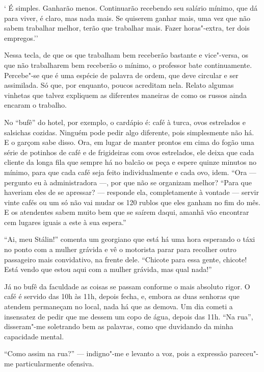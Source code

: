 ` É simples. Ganharão menos. Continuarão recebendo seu salário mínimo,
que dá para viver, é claro, mas nada mais. Se quiserem ganhar mais, uma
vez que não sabem trabalhar melhor, terão que trabalhar mais. Fazer
horas"-extra, ter dois empregos.''

Nessa tecla, de que os que trabalham bem receberão bastante e
vice"-versa, os que não trabalharem bem receberão o mínimo, o professor
bate continuamente. Percebe"-se que é uma espécie de palavra de ordem,
que deve circular e ser assimilada. Só que, por enquanto, poucos
acreditam nela. Relato algumas vinhetas que talvez expliquem as
diferentes maneiras de como os russos ainda encaram o trabalho.

No ``bufê'' do hotel, por exemplo, o cardápio é: café à turca, ovos
estrelados e salsichas cozidas. Ninguém pode pedir algo diferente, pois
simplesmente não há. E o garçom sabe disso. Ora, em lugar de manter
prontos em cima do fogão uma série de potinhos de café e de frigideiras
com ovos estrelados, ele deixa que cada cliente da longa fila que sempre
há no balcão os peça e espere quinze minutos no mínimo, para que cada
café seja feito individualmente e cada ovo, idem. ``Ora --- pergunto eu à
administradora ---, por que não se organizam melhor? ``Para que haveriam
eles de se apressar? --- responde ela, completamente à vontade --- servir
vinte cafés ou um só não vai mudar os 120 rublos que eles ganham no fim
do mês. E os atendentes sabem muito bem que se saírem daqui, amanhã vão
encontrar cem lugares iguais a este à sua espera.''

``Ai, meu Stálin!'' comenta um georgiano que está há uma hora esperando
o táxi no ponto com a mulher grávida e vê o motorista parar para
recolher outro passageiro mais convidativo, na frente dele. ``Chicote
para essa gente, chicote! Está vendo que estou aqui com a mulher
grávida, mas qual nada!''

Já no bufê da faculdade as coisas se passam conforme o mais absoluto
rigor. O café é servido das 10h às 11h, depois fecha, e, embora as duas
senhoras que atendem permaneçam no local, nada há que as demova. Um dia
cometi a insensatez de pedir que me dessem um copo de água, depois das
11h. ``Na rua'', disseram"-me soletrando bem as palavras, como que
duvidando da minha capacidade mental.

``Como assim na rua?'' --- indigno"-me e levanto a voz, pois a expressão
pareceu"-me particularmente ofensiva.

